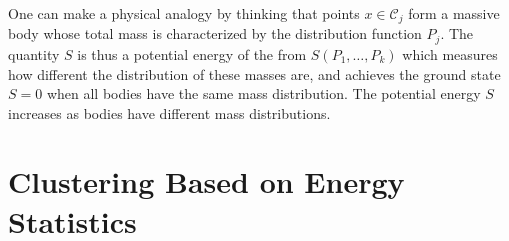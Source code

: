 \documentclass[aps,preprint,nofootinbib,floatfix]{revtex4-1}
\newcommand\C{{\mathcal{C}}}
\begin{document}
One can make a physical analogy by thinking 
that points $ x \in \C_j$ form a massive body 
whose total mass is characterized by the distribution function $P_j$.
The quantity $S$ is thus a potential
energy of the from $S(P_1,\dotsc,P_k)$ which measures how different
the distribution of these masses are,  and achieves the ground state
$S=0$ when all bodies have the same mass distribution. The potential energy
$S$ increases as bodies have different mass distributions.


\section{Clustering Based on Energy Statistics}
\label{sec:clustering_theory}



\end{document}
